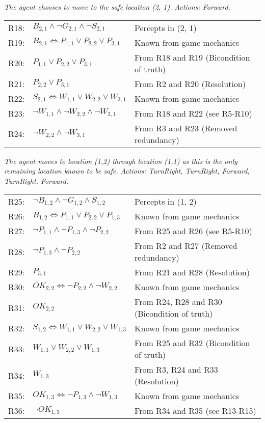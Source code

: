 \begin{enumerate}
\textit{The agent chooses to move to the safe location (2, 1). Actions: Forward.}

\begin{tabular}{rll}
R18: & \underline{$B_{2,1} \land \neg G_{2,1} \land \neg S_{2,1}$} & Percepts in (2, 1) \\
R19: & $B_{2,1} \Leftrightarrow P_{1,1} \lor P_{2,2} \lor P_{3,1}$ & Known from game mechanics \\
R20: & $P_{1,1} \lor P_{2,2} \lor P_{3,1}$ & From R18 and R19 (Bicondition of truth) \\
R21: & \underline{$P_{2,2} \lor P_{3,1}$} & From R2 and R20 (Resolution) \\
R22: & $S_{2,1} \Leftrightarrow W_{1,1} \lor W_{2,2} \lor W_{3,1}$ & Known from game mechanics \\
R23: & $\neg W_{1,1} \land \neg W_{2,2} \land \neg W_{3,1}$ & From R18 and R22 (see R5-R10) \\
R24: & \underline{$\neg W_{2,2} \land \neg W_{3,1}$} & From R3 and R23 (Removed redundancy) \\
\end{tabular}

\textit{The agent moves to location (1,2) through location (1,1) as this is the only remaining location known to be safe. Actions: TurnRight, TurnRight, Forward, TurnRight, Forward.}

\begin{tabular}{rll}
R25: & \underline{$\neg B_{1,2} \land \neg G_{1,2} \land S_{1,2}$} & Percepts in (1, 2) \\
R26: & $B_{1,2} \Leftrightarrow P_{1,1} \lor P_{2,2} \lor P_{1,3}$ & Known from game mechanics \\
R27: & $\neg P_{1,1} \land \neg P_{1,3} \land \neg P_{2,2}$ & From R25 and R26 (see R5-R10) \\ 
R28: & \underline{$\neg P_{1,3} \land \neg P_{2,2}$} & From R2 and R27 (Removed redundancy) \\
R29: & \underline{$P_{3,1}$} & From R21 and R28 (Resolution) \\
R30: & $OK_{2,2} \Leftrightarrow \neg P_{2,2} \land \neg W_{2,2}$ & Known from game mechanics \\
R31: & \underline{$OK_{2,2}$} & From R24, R28 and R30 (Bicondition of truth) \\
R32: & $S_{1,2} \Leftrightarrow W_{1,1} \lor W_{2,2} \lor W_{1,3}$ & Known from game mechanics \\
R33: & $W_{1,1} \lor W_{2,2} \lor W_{1,3}$ & From R25 and R32 (Bicondition of truth) \\
R34: & \underline{$W_{1,3}$} & From R3, R24 and R33 (Resolution) \\
R35: & $OK_{1,3} \Leftrightarrow \neg P_{1,3} \land \neg W_{1,3}$ & Known from game mechanics \\
R36: & \underline{$\neg OK_{1,3}$} & From R34 and R35 (see R13-R15) \\
\end{tabular}


\end{enumerate}
